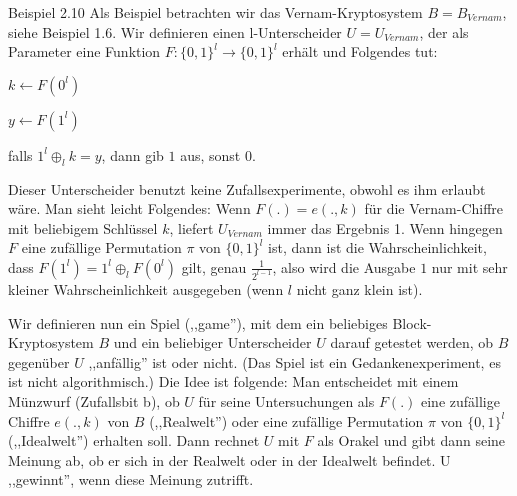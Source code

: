 \documentclass[a4paper]{article}
\begin{document}
\begin{multicols}{3}
    Beispiel 2.10 Als Beispiel betrachten wir das Vernam-Kryptosystem $B=B_{Vernam}$, siehe Beispiel 1.6. Wir definieren einen l-Unterscheider $U=U_{Vernam}$, der als Parameter eine Funktion $F:\{0,1\}^l\rightarrow\{0,1\}^l$ erhält und Folgendes tut:
    \begin{enumerate*}
        \item $k\leftarrow F(0^l)$
        \item $y\leftarrow F(1^l)$
        \item falls $1^l\oplus_l k=y$, dann gib $1$ aus, sonst $0$.
    \end{enumerate*}

    Dieser Unterscheider benutzt keine Zufallsexperimente, obwohl es ihm erlaubt wäre. Man sieht leicht Folgendes: Wenn $F(.) =e(.,k)$ für die Vernam-Chiffre mit beliebigem Schlüssel $k$, liefert $U_{Vernam}$ immer das Ergebnis 1. Wenn hingegen $F$ eine zufällige Permutation $\pi$ von $\{0,1\}^l$ ist, dann ist die Wahrscheinlichkeit, dass $F(1^l)=1^l\oplus_l F(0^l)$ gilt, genau $\frac{1}{2^{l-1}}$, also wird die Ausgabe $1$ nur mit sehr kleiner Wahrscheinlichkeit ausgegeben (wenn $l$ nicht ganz klein ist).

    Wir definieren nun ein Spiel (,,game''), mit dem ein beliebiges Block-Kryptosystem $B$ und ein beliebiger Unterscheider $U$ darauf getestet werden, ob $B$ gegenüber $U$ ,,anfällig'' ist oder nicht. (Das Spiel ist ein Gedankenexperiment, es ist nicht algorithmisch.) Die Idee ist folgende: Man entscheidet mit einem Münzwurf (Zufallsbit b), ob $U$ für seine Untersuchungen als $F(.)$ eine zufällige Chiffre $e(.,k)$ von $B$ (,,Realwelt'') oder eine zufällige Permutation $\pi$ von $\{0,1\}^l$ (,,Idealwelt'') erhalten soll. Dann rechnet $U$ mit $F$ als Orakel und gibt dann seine Meinung ab, ob er sich in der Realwelt oder in der Idealwelt befindet. U ,,gewinnt'', wenn diese Meinung zutrifft.


\end{multicols}
\end{document}
